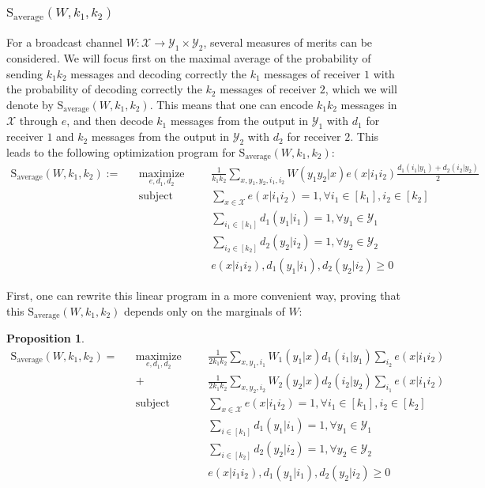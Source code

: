 \documentclass[11pt]{article}
\theoremstyle{definition}
\newtheorem{prop}[theo]{Proposition}
\theoremstyle{remark}
\DeclareMathOperator{\maxi}{\text{maximize}}
\DeclareMathOperator{\st}{\text{subject to}}
\begin{document}
\subsubsection{$\mathrm{S}_{\text{average}}(W,k_1,k_2)$}
For a broadcast channel $W : \mathcal{X} \rightarrow \mathcal{Y}_1 \times \mathcal{Y}_2$, several measures of merits can be considered. We will focus first on the maximal average of the probability of sending $k_1k_2$ messages and decoding correctly the $k_1$ messages of receiver $1$ with the probability of decoding correctly the $k_2$ messages of receiver $2$, which we will denote by $\mathrm{S}_{\text{average}}(W,k_1,k_2)$. This means that one can encode $k_1k_2$ messages in $\mathcal{X}$ through $e$, and then decode $k_1$ messages from the output in $\mathcal{Y}_1$ with $d_1$ for receiver $1$ and $k_2$ messages from the output in $\mathcal{Y}_2$ with $d_2$ for receiver $2$. This leads to the following optimization program for $\mathrm{S}_{\text{average}}(W,k_1,k_2)$:
\begin{equation}
  \begin{aligned}
    \mathrm{S}_{\text{average}}(W,k_1,k_2) := &&\underset{e,d_1,d_2}{\maxi} &&& \frac{1}{k_1k_2}\sum_{x,y_1,y_2,i_1,i_2} W(y_1y_2|x)e(x|i_1i_2)\frac{d_1(i_1|y_1) + d_2(i_2|y_2)}{2}\\
    &&\st &&& \sum_{x \in \mathcal{X}} e(x|i_1i_2) = 1, \forall i_1 \in [k_1], i_2 \in [k_2]\\
    &&&&& \sum_{i_1 \in [k_1]} d_1(y_1|i_1) = 1, \forall y_1 \in \mathcal{Y}_1\\
    &&&&& \sum_{i_2 \in [k_2]} d_2(y_2|i_2) = 1, \forall y_2 \in \mathcal{Y}_2\\
    &&&&& e(x|i_1i_2), d_1(y_1|i_1), d_2(y_2|i_2) \geq 0
  \end{aligned}
\end{equation}

First, one can rewrite this linear program in a more convenient way, proving that this $\mathrm{S}_{\text{average}}(W,k_1,k_2)$ depends only on the marginals of $W$:
\begin{prop}
  \begin{equation}
  \begin{aligned}
    \mathrm{S}_{\text{average}}(W,k_1,k_2) = &&\underset{e,d_1,d_2}{\maxi} &&& \frac{1}{2k_1k_2}\sum_{x,y_1,i_1} W_1(y_1|x)d_1(i_1|y_1)\sum_{i_2} e(x|i_1i_2)\\
    &&+&&& \frac{1}{2k_1k_2}\sum_{x,y_2,i_2} W_2(y_2|x)d_2(i_2|y_2)\sum_{i_1} e(x|i_1i_2)\\
    &&\st &&& \sum_{x \in \mathcal{X}} e(x|i_1i_2) = 1, \forall i_1 \in [k_1], i_2 \in [k_2]\\
    &&&&& \sum_{i \in [k_1]} d_1(y_1|i_1) = 1, \forall y_1 \in \mathcal{Y}_1\\
    &&&&& \sum_{i \in [k_2]} d_2(y_2|i_2) = 1, \forall y_2 \in \mathcal{Y}_2\\
    &&&&& e(x|i_1i_2), d_1(y_1|i_1), d_2(y_2|i_2) \geq 0
  \end{aligned}
\end{equation}

\end{prop}
\end{document}
